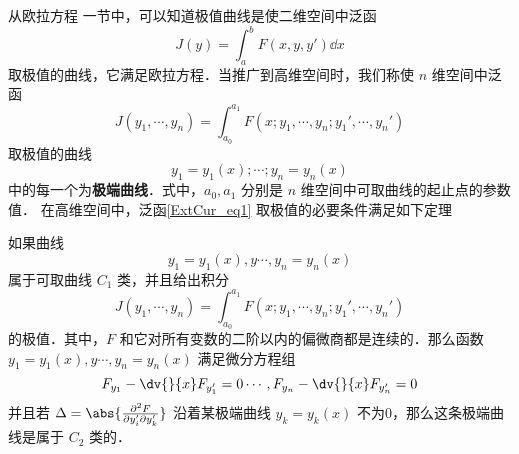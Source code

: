 

从欧拉方程 一节中，可以知道极值曲线是使二维空间中泛函 
\begin{equation}
J(y)=\int_a^b F(x,y,y')\dd x
\end{equation}
取极值的曲线，它满足欧拉方程．当推广到高维空间时，我们称使 $n$ 维空间中泛函 
\begin{equation}\label{ExtCur_eq1}
J(y_1,\cdots, y_n)=\int_{a_0}^{a_1}F(x;y_1,\cdots,y_n;y_1',\cdots,y_n') 
\end{equation}
取极值的曲线 
\begin{equation}
y_1=y_1(x);\cdots;y_n=y_n(x)
\end{equation}
中的每一个为\textbf{极端曲线}．式中，$a_0,a_1$ 分别是 $n$ 维空间中可取曲线的起止点的参数值． 
在高维空间中，泛函\autoref{ExtCur_eq1} 取极值的必要条件满足如下定理
\begin{theorem}{}
如果曲线 
\begin{equation}
y_1=y_1(x),y\cdots,y_n=y_n(x)
\end{equation}
属于可取曲线 $C_1$ 类，并且给出积分 
\begin{equation}
J(y_1,\cdots, y_n)=\int_{a_0}^{a_1}F(x;y_1,\cdots,y_n;y_1',\cdots,y_n') 
\end{equation}
 的极值．其中，$F$ 和它对所有变数的二阶以内的偏微商都是连续的．那么函数 $y_1=y_1(x),y\cdots,y_n=y_n(x)$ 满足微分方程组
\begin{equation}
F_{y_1}-\dv{}{x}F_{y_1'}=0\cdots, F_{y_n}-\dv{}{x}F_{y_n'}=0
\end{equation}
并且若 $\Delta=\abs{\frac{\partial^2 F}{\partial y_i'\partial y_k'}}$ 沿着某极端曲线 $y_k=y_k(x)$ 不为0，那么这条极端曲线是属于 $C_2$ 类的．
\end{theorem}
